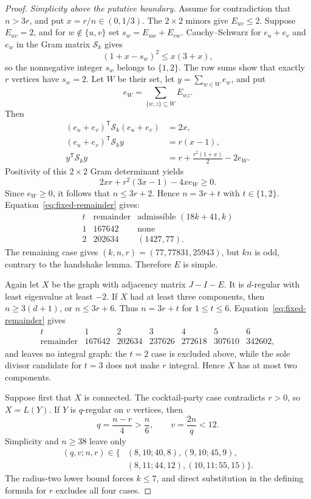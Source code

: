 \documentclass[a4paper,10pt,reqno]{amsart}
\theoremstyle{plain}
\theoremstyle{definition}
\theoremstyle{remark}
\begin{document}
\begin{proof}
 \smallskip
\noindent\emph{Simplicity above the putative boundary.}
 Assume for contradiction that \(n>3r\), and put \(x=r/n\in(0,1/3)\).
 The \(2\times2\) minors give \(E_{uv}\le2\).  Suppose \(E_{uv}=2\), and
 for \(w\notin\{u,v\}\) set \(s_w=E_{uw}+E_{vw}\).  Cauchy--Schwarz for
 \(e_u+e_v\) and \(e_w\) in the Gram matrix \(\mathcal S_k\) gives
\[
 (1+x-s_w)^2\le x(3+x),
\]
 so the nonnegative integer \(s_w\) belongs to \(\{1,2\}\).  The row sums
 show that exactly \(r\) vertices have \(s_w=2\).  Let \(W\) be their set,
 let \(y=\sum_{w\in W}e_w\), and put
\[
  e_W=\sum_{\{w,z\}\subseteq W}E_{wz}.
\]
 Then
\[
 \begin{aligned}
  (e_u+e_v)^{\mathsf T}\mathcal S_k(e_u+e_v)&=2x,\\
  (e_u+e_v)^{\mathsf T}\mathcal S_k y&=r(x-1),\\
  y^{\mathsf T}\mathcal S_k y&=r+\frac{r^2(1+x)}2-2e_W.
 \end{aligned}
\]
 Positivity of this \(2\times2\) Gram determinant yields
 \[
  2xr+r^2(3x-1)-4xe_W\ge0.
 \]
 Since \(e_W\ge0\), it follows that \(n\le3r+2\).  Hence
 \(n=3r+t\) with \(t\in\{1,2\}\).  Equation~\eqref{eq:fixed-remainder}
 gives:
 \[
 \begin{array}{c|c|c}
  t&\text{remainder}&\text{admissible }(18k+41,k)\\
  \hline
  1&167642&\text{none}\\
  2&202634&(1427,77).
 \end{array}
 \]
 The remaining case gives \((k,n,r)=(77,77831,25943)\), but \(kn\) is odd,
 contrary to the handshake lemma.  Therefore \(E\) is simple.

 Again let \(X\) be the graph with adjacency matrix \(J-I-E\).  It is
 \(d\)-regular with least eigenvalue at least
 \(-2\).  If \(X\) had at least three components, then
 \(n\ge3(d+1)\), or \(n\le3r+6\).  Thus \(n=3r+t\) for
 \(1\le t\le6\).  Equation~\eqref{eq:fixed-remainder} gives
 \[
 \begin{array}{c|rrrrrr}
  t&1&2&3&4&5&6\\ \hline
  \text{remainder}
   &167642&202634&237626&272618&307610&342602,
 \end{array}
 \]
 and leaves no integral graph: the \(t=2\) case is excluded above, while the
 sole divisor candidate for \(t=3\) does not make \(r\) integral.  Hence \(X\)
 has at most two components.

 Suppose first that \(X\) is connected.  The cocktail-party case contradicts
 \(r>0\), so \(X=L(Y)\).  If \(Y\) is \(q\)-regular on \(v\) vertices, then
 \[
  q=\frac{n-r}{4}>\frac n6,\qquad v=\frac{2n}{q}<12.
 \]
 Simplicity and \(n\ge38\) leave only
 \[
 \begin{aligned}
  (q,v;n,r)\in\{&(8,10;40,8),(9,10;45,9),\\
                 &(8,11;44,12),(10,11;55,15)\}.
 \end{aligned}
 \]
 The radius-two lower bound forces \(k\le7\), and direct substitution in the
 defining formula for \(r\) excludes all four cases.


\end{proof}
\end{document}
